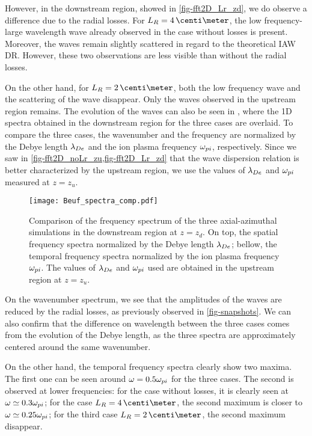   However, in the downstream region, showed in \cref{fig-fft2D_Lr_zd}, we do observe a difference due to the radial losses.
  For $L_R=4\,\centi\meter$, the low frequency-large wavelength wave already observed in the case without losses is present.
  Moreover, the waves remain slightly scattered in regard to the theoretical \ac{IAW} \ac{DR}.
  However, these two observations are less visible than without the radial losses.

  On the other hand, for $L_R=2\,\centi\meter$, both the low frequency wave and the scattering of the wave disappear.
  Only the waves observed in the upstream region remains.
  The evolution of the waves can also be seen in , where the \ac{1D} spectra obtained in the downstream region for the three cases are overlaid.
  To compare the three cases, the wavenumber and the frequency are normalized by the Debye length $\lambda_{De}$ and the ion plasma frequency $\omega_{pi}$, respectively.
  Since we saw  in \cref{fig-fft2D_noLr_zu,fig-fft2D_Lr_zd} that the wave dispersion relation is better characterized by the upstream region, we use the values of $\lambda_{De}$ and $\omega_{pi}$ measured at $z=z_u$.


  \begin{figure}[hbtp]
    \centering
    \texttt{[image: Beuf\_spectra\_comp.pdf]}
    \caption{Comparison of the frequency spectrum of the three axial-azimuthal simulations in the downstream region at $z=z_d$. On top, the spatial frequency spectra normalized by the Debye length $\lambda_{De}$\string; bellow, the temporal frequency spectra normalized by the ion plasma frequency $\omega_{pi}$. The values of $\lambda_{De}$ and $\omega_{pi}$ used are obtained in the upstream region at $z=z_u$.}
    \label{fig-boeuf_fft_comparasion}
  \end{figure}


  On the wavenumber spectrum, we see that the amplitudes of the waves are reduced by the radial losses, as previously observed in \cref{fig-snapshots}.
  We can also confirm that the difference on wavelength between the three cases comes from the evolution of the Debye length, as the three spectra are approximately centered around the same wavenumber.

  On the other hand, the temporal frequency spectra clearly show two maxima. 
  The first one can be seen around $\omega = 0.5 \omega_{pi}$ for the three cases.
  The second is observed at lower frequencies\string: for the case without losses, it is clearly seen at  $\omega \simeq 0.3 \omega_{pi}$\string; for the case $L_R=4\,\centi\meter$, the second maximum is closer to $\omega \simeq 0.25 \omega_{pi}$\string; for the third case $L_R=2\,\centi\meter$, the second maximum disappear. %
  
